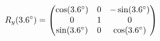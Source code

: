 \documentclass[preview]{standalone}
\begin{document}
\begin{align*}
\special{dvisvgm:raw <g id='unique000'>}R_y(3.6^\circ) = \begin{pmatrix} \cos(3.6^\circ) & 0 & -\sin(3.6^\circ) \\ 0 & 1 & 0 \\ \sin(3.6^\circ) & 0 & \cos(3.6^\circ) \end{pmatrix}\special{dvisvgm:raw </g>}
\end{align*}
\end{document}
